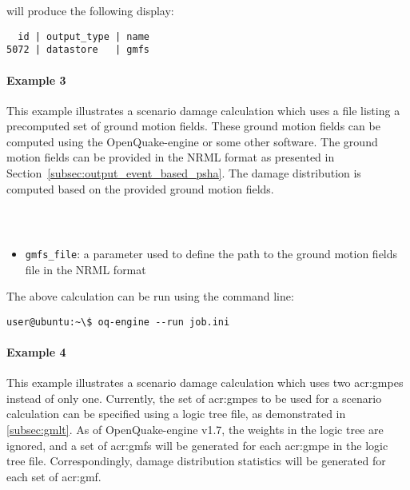 will produce the following display:

\begin{verbatim}
  id | output_type | name
5072 | datastore   | gmfs
\end{verbatim}


\paragraph{Example 3}

This example illustrates a scenario damage calculation which uses a file
listing a precomputed set of ground motion fields. These ground motion fields
can be computed using the OpenQuake-engine or some other software. The ground
motion fields can be provided in the NRML format as presented in
Section~\ref{subsec:output_event_based_psha}. The damage distribution is
computed based on the provided ground motion fields.

\inputminted[firstline=1,firstnumber=1,fontsize=\footnotesize,frame=single,linenos,bgcolor=lightgray,label=job.ini]{ini}{oqum/risk/verbatim/config_scenario_damage_gmf.ini}\\

\begin{itemize}

  \item \Verb+gmfs_file+: a parameter used to define the path
	  to the ground motion fields file in the NRML format

\end{itemize}

The above calculation can be run using the command line:

\begin{verbatim}
user@ubuntu:~\$ oq-engine --run job.ini
\end{verbatim}


\paragraph{Example 4}

This example illustrates a scenario damage calculation which uses two
\glspl{acr:gmpe} instead of only one. Currently, the set of \glspl{acr:gmpe}
to be used for a scenario calculation can be specified using a logic tree
file, as demonstrated in \ref{subsec:gmlt}. As of OpenQuake-engine v1.7, the
weights in the logic tree are ignored, and a set of \glspl{acr:gmf} will be
generated for each \gls{acr:gmpe} in the logic tree file. Correspondingly,
damage distribution statistics will be generated for each set of
\gls{acr:gmf}.

